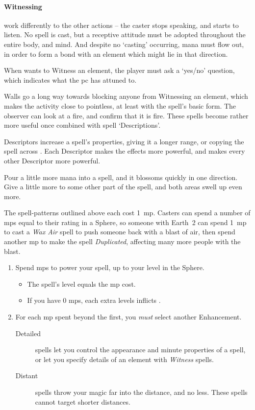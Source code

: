 \begin{multicols}{2}
\paragraph{Witnessing}
work differently to the other actions -- the caster stops speaking, and starts to listen.
No spell is cast, but a receptive attitude must be adopted throughout the entire body, and mind.
And despite no `casting' occurring, mana must flow out, in order to form a bond with an element which might lie in that direction.

When  wants to Witness an element, the player must ask a `yes/no' question, which indicates what the \gls{pc} has attuned to.

Walls go a long way towards blocking anyone from Witnessing an element, which makes the activity close to pointless, at least with the spell's basic form.
The observer can look at a fire, and confirm that it is fire.
These spells become rather more useful once combined with spell `Descriptions'.


Descriptors increase a spell's properties, giving it a longer range, or copying the spell across .
Each Descriptor makes the effects more powerful, and makes every other Descriptor more powerful.

Pour a little more mana into a spell, and it blossoms quickly in one direction.
Give a little more to some other part of the spell, and both areas swell up even more.

The spell-patterns outlined above each cost 1~\gls{mp}.
Casters can spend a number of \glspl{mp} equal to their rating in a Sphere, so someone with Earth~2 can spend 1~\gls{mp} to cast a \textit{Wax Air} spell to push someone back with a blast of air, then spend another \gls{mp} to make the spell \textit{Duplicated}, affecting many more people with the blast.

\begin{enumerate}
  \item
  Spend \glspl{mp} to power your spell, up to your level in the Sphere.
  \begin{itemize}
    \item
    The spell's level equals the \gls{mp} cost.
    \item
    If you have 0 \glspl{mp}, each extra levels inflicts .
  \end{itemize}
  \item
  For each \gls{mp} spent beyond the first, you \emph{must} select another Enhancement.
  \begin{description}
    \item[Detailed]
    spells let you control the appearance and minute properties of a spell, or let you specify details of an element with \textit{Witness} spells. 
    \item[Distant]
    spells throw your magic far into the distance, and no less.
    These spells cannot target shorter distances.


\end{description}
\end{enumerate}
\end{multicols}
